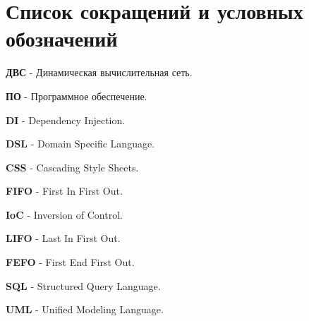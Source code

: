 \chapter*{Список сокращений и условных обозначений}             %
%
\textbf{ДВС} - Динамическая вычислительная сеть.

\textbf{ПО} - Программное обеспечение.

\textbf{DI} - Dependency Injection.

\textbf{DSL} - Domain Specific Language.

\textbf{CSS} - Cascading Style Sheets.

\textbf{FIFO} - First In First Out.

\textbf{IoC} - Inversion of Control.

\textbf{LIFO} - Last In First Out.

\textbf{FEFO} - First End First Out.

\textbf{SQL} - Structured Query Language.

\textbf{UML} - Unified Modeling Language.